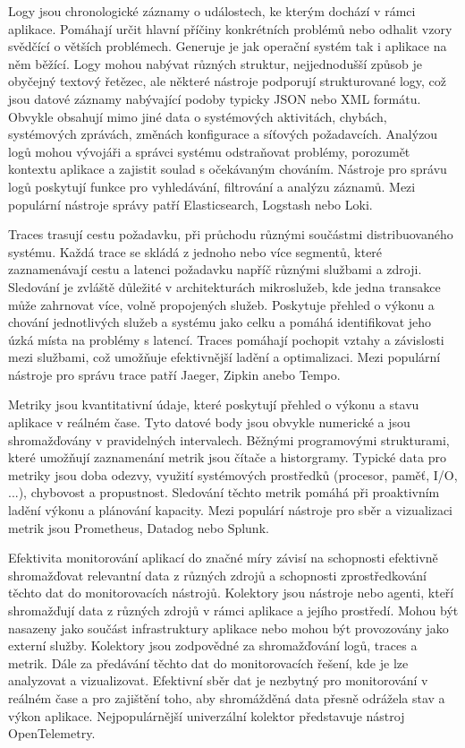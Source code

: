 
Logy jsou chronologické záznamy o událostech, ke kterým dochází v rámci aplikace. Pomáhají určit hlavní příčiny konkrétních problémů nebo odhalit vzory svědčící o větších problémech. Generuje je jak operační systém tak i aplikace na něm běžící. Logy mohou nabývat různých struktur, nejjednodušší způsob je obyčejný textový řetězec, ale některé nástroje podporují strukturované logy, což jsou datové záznamy nabývající podoby typicky JSON nebo XML formátu. Obvykle obsahují mimo jiné data o systémových aktivitách, chybách, systémových zprávách, změnách konfigurace a síťových požadavcích. Analýzou logů mohou vývojáři a správci systému odstraňovat problémy, porozumět kontextu aplikace a zajistit soulad s očekávaným chováním. Nástroje pro správu logů poskytují funkce pro vyhledávání, filtrování a analýzu záznamů. Mezi populární nástroje správy patří Elasticsearch, Logstash nebo Loki.


Traces trasují cestu požadavku, při průchodu různými součástmi distribuovaného systému. Každá trace se skládá z jednoho nebo více segmentů, které zaznamenávají cestu a latenci požadavku napříč různými službami a zdroji. Sledování je zvláště důležité v architekturách mikroslužeb, kde jedna transakce může zahrnovat více, volně propojených služeb. Poskytuje přehled o výkonu a chování jednotlivých služeb a systému jako celku a pomáhá identifikovat jeho úzká místa na problémy s latencí. Traces pomáhají pochopit vztahy a závislosti mezi službami, což umožňuje efektivnější ladění a optimalizaci. Mezi populární nástroje pro správu trace patří Jaeger, Zipkin anebo Tempo. \cite{Molkova2023}


Metriky jsou kvantitativní údaje, které poskytují přehled o výkonu a stavu aplikace v reálném čase. Tyto datové body jsou obvykle numerické a jsou shromažďovány v pravidelných intervalech. Běžnými programovými strukturami, které umožňují zaznamenání metrik jsou čítače a historgramy. Typické data pro metriky jsou doba odezvy, využití systémových prostředků (procesor, paměť, I/O, ...), chybovost a propustnost. Sledování těchto metrik pomáhá při proaktivním ladění výkonu a plánování kapacity. Mezi populárí nástroje pro sběr a vizualizaci metrik jsou Prometheus, Datadog nebo Splunk.


Efektivita monitorování aplikací do značné míry závisí na schopnosti efektivně shromažďovat relevantní data z různých zdrojů a schopnosti zprostředkování těchto dat do monitorovacích nástrojů. Kolektory jsou nástroje nebo agenti, kteří shromažďují data z různých zdrojů v rámci aplikace a jejího prostředí. Mohou být nasazeny jako součást infrastruktury aplikace nebo mohou být provozovány jako externí služby. Kolektory jsou zodpovědné za shromažďování logů, traces a metrik. Dále za předávání těchto dat do monitorovacích řešení, kde je lze analyzovat a vizualizovat. Efektivní sběr dat je nezbytný pro monitorování v reálném čase a pro zajištění toho, aby shromážděná data přesně odrážela stav a výkon aplikace. Nejpopulárnější univerzální kolektor představuje nástroj OpenTelemetry. \cite{Blanco2023}

